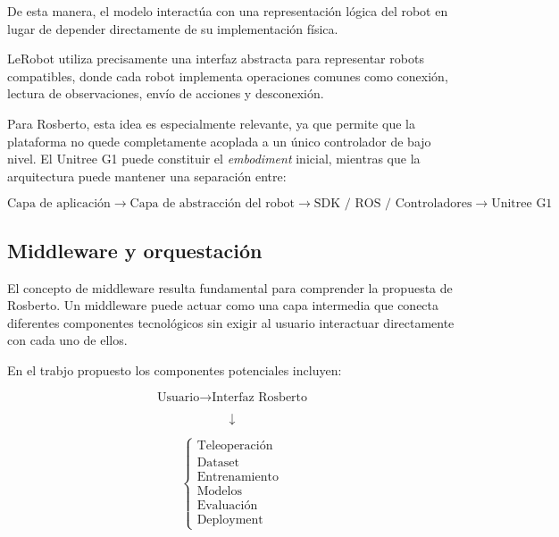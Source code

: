 \documentclass[stu,12pt,floatsintext]{apa7}
\begin{document}
De esta manera, el modelo interactúa con una representación lógica del robot en lugar de depender directamente de su implementación física.

LeRobot utiliza precisamente una interfaz abstracta para representar robots compatibles, donde cada robot implementa operaciones comunes como conexión, lectura de observaciones, envío de acciones y desconexión.

Para Rosberto, esta idea es especialmente relevante, ya que permite que la plataforma no quede completamente acoplada a un único controlador de bajo nivel. El Unitree G1 puede constituir el \textit{embodiment} inicial, mientras que la arquitectura puede mantener una separación entre:

\begin{equation}
\text{Capa de aplicación}
\rightarrow
\text{Capa de abstracción del robot}
\rightarrow
\text{SDK / ROS / Controladores}
\rightarrow
\text{Unitree G1}
\end{equation}

\subsection{Middleware y orquestación}

El concepto de middleware resulta fundamental para comprender la propuesta de Rosberto. Un middleware puede actuar como una capa intermedia que conecta diferentes componentes tecnológicos sin exigir al usuario interactuar directamente con cada uno de ellos.

En el trabjo propuesto los componentes potenciales incluyen:

\begin{equation}
\text{Usuario}
\rightarrow
\text{Interfaz Rosberto}
\end{equation}

\begin{equation}
\downarrow
\end{equation}

\begin{equation}
\begin{cases}
\text{Teleoperación}\\
\text{Dataset}\\
\text{Entrenamiento}\\
\text{Modelos}\\
\text{Evaluación}\\
\text{Deployment}
\end{cases}
\end{equation}
\end{document}
